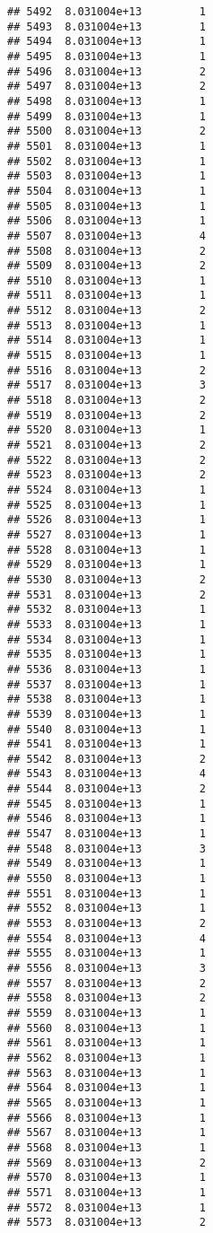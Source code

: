 \documentclass[
]{article}
\begin{document}
\begin{verbatim}
## 5492  8.031004e+13         1
## 5493  8.031004e+13         1
## 5494  8.031004e+13         1
## 5495  8.031004e+13         1
## 5496  8.031004e+13         2
## 5497  8.031004e+13         2
## 5498  8.031004e+13         1
## 5499  8.031004e+13         1
## 5500  8.031004e+13         2
## 5501  8.031004e+13         1
## 5502  8.031004e+13         1
## 5503  8.031004e+13         1
## 5504  8.031004e+13         1
## 5505  8.031004e+13         1
## 5506  8.031004e+13         1
## 5507  8.031004e+13         4
## 5508  8.031004e+13         2
## 5509  8.031004e+13         2
## 5510  8.031004e+13         1
## 5511  8.031004e+13         1
## 5512  8.031004e+13         2
## 5513  8.031004e+13         1
## 5514  8.031004e+13         1
## 5515  8.031004e+13         1
## 5516  8.031004e+13         2
## 5517  8.031004e+13         3
## 5518  8.031004e+13         2
## 5519  8.031004e+13         2
## 5520  8.031004e+13         1
## 5521  8.031004e+13         2
## 5522  8.031004e+13         2
## 5523  8.031004e+13         2
## 5524  8.031004e+13         1
## 5525  8.031004e+13         1
## 5526  8.031004e+13         1
## 5527  8.031004e+13         1
## 5528  8.031004e+13         1
## 5529  8.031004e+13         1
## 5530  8.031004e+13         2
## 5531  8.031004e+13         2
## 5532  8.031004e+13         1
## 5533  8.031004e+13         1
## 5534  8.031004e+13         1
## 5535  8.031004e+13         1
## 5536  8.031004e+13         1
## 5537  8.031004e+13         1
## 5538  8.031004e+13         1
## 5539  8.031004e+13         1
## 5540  8.031004e+13         1
## 5541  8.031004e+13         1
## 5542  8.031004e+13         2
## 5543  8.031004e+13         4
## 5544  8.031004e+13         2
## 5545  8.031004e+13         1
## 5546  8.031004e+13         1
## 5547  8.031004e+13         1
## 5548  8.031004e+13         3
## 5549  8.031004e+13         1
## 5550  8.031004e+13         1
## 5551  8.031004e+13         1
## 5552  8.031004e+13         1
## 5553  8.031004e+13         2
## 5554  8.031004e+13         4
## 5555  8.031004e+13         1
## 5556  8.031004e+13         3
## 5557  8.031004e+13         2
## 5558  8.031004e+13         2
## 5559  8.031004e+13         1
## 5560  8.031004e+13         1
## 5561  8.031004e+13         1
## 5562  8.031004e+13         1
## 5563  8.031004e+13         1
## 5564  8.031004e+13         1
## 5565  8.031004e+13         1
## 5566  8.031004e+13         1
## 5567  8.031004e+13         1
## 5568  8.031004e+13         1
## 5569  8.031004e+13         2
## 5570  8.031004e+13         1
## 5571  8.031004e+13         1
## 5572  8.031004e+13         1
## 5573  8.031004e+13         2

\end{verbatim}
\end{document}
